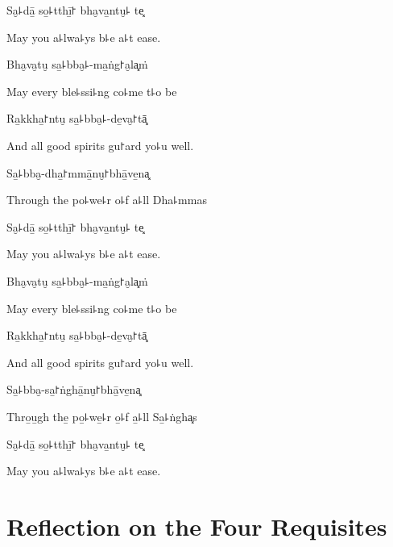 Sa̮꜕dā̱ so̱꜕tthī̱꜓ bha̮va̱ntu̮꜕ te͓

\begin{english}
  May you a꜕lwa꜕ys b꜕e a꜕t ease.
\end{english}

\ifaivedition
\clearpage
\fi

Bha̮va̮tu̮ sa̱꜕bba̮꜕-ma̱ṅg꜓a̮la͓ṁ

\begin{english}
  May every ble꜕ssi꜕ng co꜕me t꜕o be
\end{english}

Ra̱kkha̱꜓ntu̮ sa̱꜕bba̮꜕-de̱va̮꜓tā͓

\begin{english}
  And all good spirits gu꜓ard yo꜕u well.
\end{english}

Sa̱꜕bba̮-dha̱꜓mmā̱nu̮꜓bhā̱ve̱na͓

\begin{english}
  Through the po꜕we꜕r o꜕f a꜕ll Dha꜕mmas
\end{english}

Sa̮꜕dā̱ so̱꜕tthī̱꜓ bha̮va̱ntu̮꜕ te͓

\begin{english}
  May you a꜕lwa꜕ys b꜕e a꜕t ease.
\end{english}

Bha̮va̮tu̮ sa̱꜕bba̮꜕-ma̱ṅg꜓a̮la͓ṁ

\begin{english}
  May every ble꜕ssi꜕ng co꜕me t꜕o be
\end{english}

Ra̱kkha̱꜓ntu̮ sa̱꜕bba̮꜕-de̱va̮꜓tā͓

\begin{english}
  And all good spirits gu꜓ard yo꜕u well.
\end{english}

Sa̱꜕bba̮-sa̱꜓ṅghā̱nu̮꜓bhā̱ve̱na͓

\begin{english}
  Thro̱u̱gh the̱ po̱꜕we̱꜕r o̱꜕f a̱꜕ll Sa̱꜕ṅgha͓s
\end{english}

Sa̮꜕dā̱ so̱꜕tthī̱꜓ bha̮va̱ntu̮꜕ te͓

\begin{english}
  May you a꜕lwa꜕ys b꜕e a꜕t ease.
\end{english}

\chapter[Four Requisites]{Reflection on the Four Requisites}

